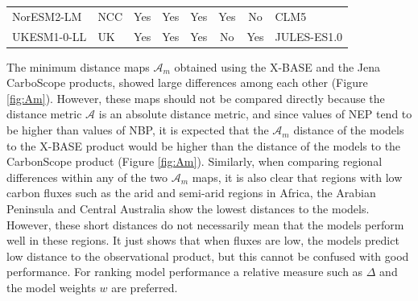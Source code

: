 \documentclass[gmd, manuscript]{copernicus}
\begin{document}
\begin{table}[t]
\begin{tabular}{llcccccl}
NorESM2-LM                                                             & NCC                                                                  & Yes                              & Yes                              & Yes                                                      & Yes                                                      & No                                                                                         & CLM5                                                                 \\
UKESM1-0-LL                                                            & UK                                                                   & Yes                              & Yes                              & Yes                                                      & No                                                       & Yes                                                                                        & JULES-ES1.0                                                          \\ 
\bottomrule
\end{tabular}
\end{table}


The minimum distance maps $\mathcal{A}_m$ obtained using the X-BASE and the Jena CarboScope products, showed large differences among each other (Figure \ref{fig:Am}). However, these maps should not be compared directly because the distance metric $\mathcal{A}$ is an absolute distance metric, and since values of NEP tend to be higher than values of NBP, it is expected that the $\mathcal{A}_m$ distance of the models to the X-BASE product would be higher than the distance of the models to the CarbonScope product (Figure \ref{fig:Am}). 
Similarly, when comparing regional differences within any of the two $\mathcal{A}_m$ maps, it is also clear that regions with low carbon fluxes such as the arid and semi-arid regions in Africa, the Arabian Peninsula and Central Australia show the lowest distances to the models. However, these short distances do not necessarily mean that the models perform well in these regions. It just shows that when fluxes are low, the models predict low distance to the observational product, but this cannot be confused with good performance. 
For ranking model performance a relative measure such as $\Delta$ and the model weights $w$ are preferred.
\end{document}
